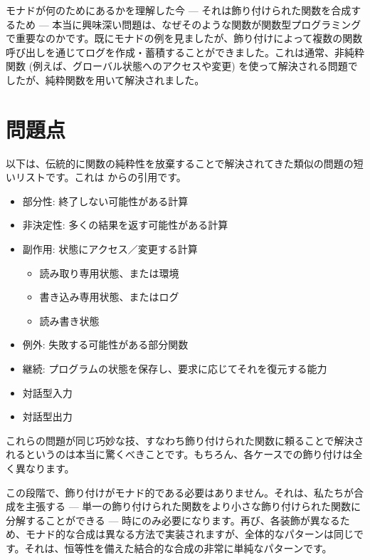 
\lettrine[lhang=0.17]{モ}{ナド}が何のためにあるかを理解した今 --- それは飾り付けられた関数を合成するため --- 本当に興味深い問題は、なぜそのような関数が関数型プログラミングで重要なのかです。既にモナドの例を見ましたが、飾り付けによって複数の関数呼び出しを通じてログを作成・蓄積することができました。これは通常、非純粋関数 (例えば、グローバル状態へのアクセスや変更) を使って解決される問題でしたが、純粋関数を用いて解決されました。

\section{問題点}

以下は、伝統的に関数の純粋性を放棄することで解決されてきた類似の問題の短いリストです。これは
からの引用です。

\begin{itemize}
  \tightlist
  \item
        部分性: 終了しない可能性がある計算
  \item
        非決定性: 多くの結果を返す可能性がある計算
  \item
        副作用: 状態にアクセス／変更する計算

        \begin{itemize}
          \tightlist
          \item
                読み取り専用状態、または環境
          \item
                書き込み専用状態、またはログ
          \item
                読み書き状態
        \end{itemize}
  \item
        例外: 失敗する可能性がある部分関数
  \item
        継続: プログラムの状態を保存し、要求に応じてそれを復元する能力
  \item
        対話型入力
  \item
        対話型出力
\end{itemize}

これらの問題が同じ巧妙な技、すなわち飾り付けられた関数に頼ることで解決されるというのは本当に驚くべきことです。もちろん、各ケースでの飾り付けは全く異なります。

この段階で、飾り付けがモナド的である必要はありません。それは、私たちが合成を主張する --- 単一の飾り付けられた関数をより小さな飾り付けられた関数に分解することができる --- 時にのみ必要になります。再び、各装飾が異なるため、モナド的な合成は異なる方法で実装されますが、全体的なパターンは同じです。それは、恒等性を備えた結合的な合成の非常に単純なパターンです。

